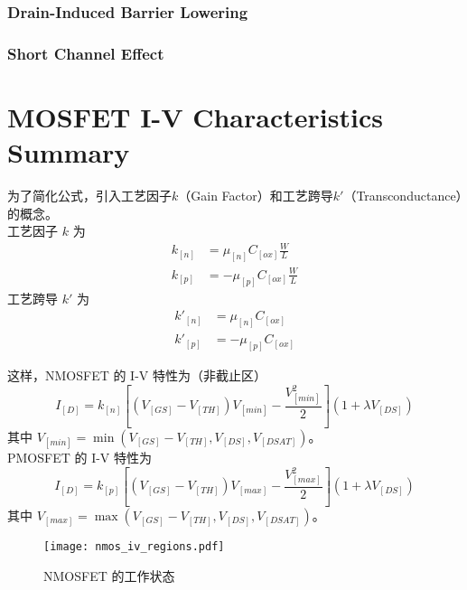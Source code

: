 \subsubsection{Drain-Induced Barrier Lowering}

\subsubsection{Short Channel Effect}

\section{MOSFET I-V Characteristics Summary}

为了简化公式，引入工艺因子$k$（Gain Factor）和工艺跨导$k'$（Transconductance）的概念。\\
工艺因子 $k$ 为
\begin{equation}
    \begin{aligned}
        k_[n] &= \mu_[n] C_[ox] \frac{W}{L} \\
        k_[p] &= -\mu_[p] C_[ox] \frac{W}{L}
    \end{aligned}
\end{equation}
工艺跨导 $k'$ 为
\begin{equation}
    \begin{aligned}
        k'_[n] &= \mu_[n] C_[ox] \\
        k'_[p] &= -\mu_[p] C_[ox]
    \end{aligned}
\end{equation}

这样，NMOSFET 的 I-V 特性为（非截止区）
\begin{equation}
    I_[D] = k_[n] \left[ (V_[GS] - V_[TH]) V_[min] - \frac{V_[min]^2}{2} \right] \left(1 + \lambda V_[DS]\right)
\end{equation}
其中 $V_[min] = \min \left(V_[GS] - V_[TH], V_[DS], V_[DSAT]\right)$。\\
PMOSFET 的 I-V 特性为
\begin{equation}
    I_[D] = k_[p] \left[ (V_[GS] - V_[TH]) V_[max] - \frac{V_[max]^2}{2} \right] \left(1 + \lambda V_[DS]\right)
\end{equation}
其中 $V_[max] = \max \left(V_[GS] - V_[TH], V_[DS], V_[DSAT]\right)$。

\begin{figure}[!hbt]
    \centering
    \texttt{[image: nmos\_iv\_regions.pdf]}
    \caption{NMOSFET 的工作状态}
    \label{fig:nmos_iv_regions}
\end{figure}

